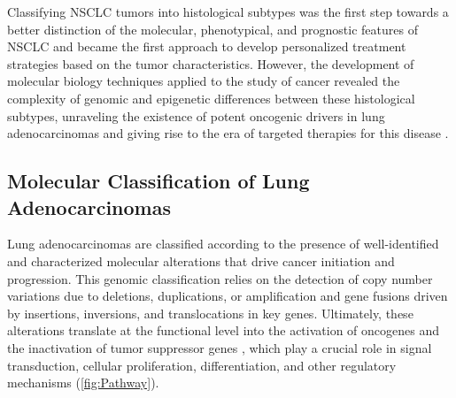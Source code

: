 \begin{itemize}
\end{itemize}


Classifying NSCLC tumors into histological subtypes was the first step towards a better distinction of the molecular, phenotypical, and prognostic features of NSCLC and became the first approach to develop personalized treatment strategies based on the tumor characteristics. However, the development of molecular biology techniques applied to the study of cancer revealed the complexity of genomic and epigenetic differences between these histological subtypes, unraveling the existence of potent oncogenic drivers in lung adenocarcinomas and giving rise to the era of targeted therapies for this disease \cite{Mol_bio}.

\subsection{Molecular Classification of Lung Adenocarcinomas}

Lung adenocarcinomas are classified according to the presence of well-identified and characterized molecular alterations that drive cancer initiation and progression. This genomic classification relies on the detection of copy number variations due to deletions, duplications, or amplification and gene fusions driven by insertions, inversions, and translocations in key genes. Ultimately, these alterations translate at the functional level into the activation of oncogenes and the inactivation of tumor suppressor genes \cite{Mol_markers, Gene_express}, which play a crucial role in signal transduction, cellular proliferation, differentiation, and other regulatory mechanisms (\autoref{fig:Pathway}).

